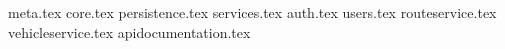 {meta.tex}
{core.tex}
{persistence.tex}
{services.tex}
{auth.tex}
{users.tex}
{routeservice.tex}
{vehicleservice.tex}
{apidocumentation.tex}
